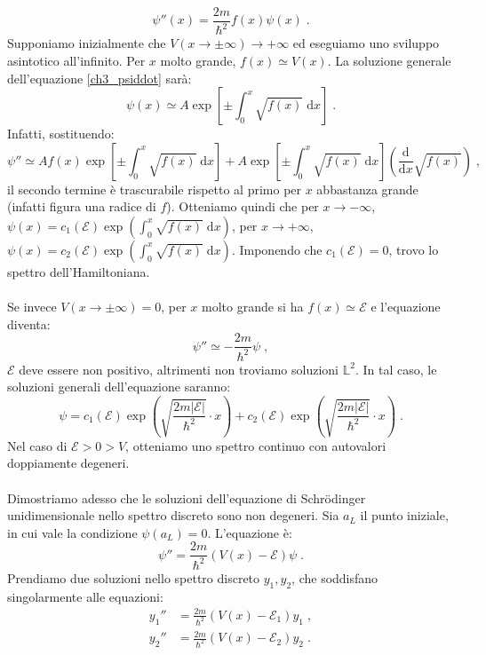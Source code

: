 \documentclass[10pt,a4paper]{report}
\theoremstyle{definition}
\numberwithin{equation}{section}
\newcommand{\diff}[1][]{\mathrm{d}#1}
\begin{document}
\begin{equation}
\psi''(x)=\frac{2m}{\hbar^2}f(x)\psi(x)\;. \label{ch3_psiddot}
\end{equation}
Supponiamo inizialmente che $V(x\to\pm\infty)\to +\infty$ ed eseguiamo uno sviluppo asintotico all'infinito. Per $x$ molto grande, $f(x)\simeq V(x)$. La soluzione generale dell'equazione \eqref{ch3_psiddot} sarà:
\begin{equation}
\psi(x)\simeq A\exp\left[\pm\int_{0}^{x}\sqrt{f(x)}\;\diff{x}\right]\;.
\end{equation}
Infatti, sostituendo:
$$
\psi''\simeq Af(x)\exp\left[\pm\int_{0}^{x} \sqrt{f(x)}\;\diff{x}\right]+ A\exp\left[\pm\int_{0}^{x} \sqrt{f(x)}\;\diff{x}\right]\left(\frac{\mathrm{d}}{\diff{x}}\sqrt{f(x)}\right)\;,
$$
il secondo termine è trascurabile rispetto al primo per $x$ abbastanza grande (infatti figura una radice di $f$). Otteniamo quindi che per $x\to -\infty$, $\psi(x)=c_1(\mathcal{E})\exp\left(\int_0^x \sqrt{f(x)}\;\diff{x}\right)$, per $x\to +\infty$, $\psi(x)=c_2(\mathcal{E})\exp\left(\int_0^x \sqrt{f(x)}\;\diff{x}\right)$. Imponendo che $c_1(\mathcal{E})=0$, trovo lo spettro dell'Hamiltoniana. \\
\\
Se invece $V(x\to\pm\infty)=0$, per $x$ molto grande si ha $f(x)\simeq \mathcal{E}$ e l'equazione diventa:
$$
\psi''\simeq -\frac{2m}{\hbar^2}\psi\;,
$$
$\mathcal{E}$ deve essere non positivo, altrimenti non troviamo soluzioni $\mathbb{L}^2$. In tal caso, le soluzioni generali dell'equazione saranno:
\begin{equation}
\psi=c_1(\mathcal{E})\exp\left(\sqrt{\frac{2m|\mathcal{E}|}{\hbar^2}}\cdot x\right)+c_2(\mathcal{E})\exp\left(\sqrt{\frac{2m|\mathcal{E}|}{\hbar^2}}\cdot x\right)\;.
\end{equation}
Nel caso di $\mathcal{E}>0>V$, otteniamo uno spettro continuo con autovalori doppiamente degeneri. \\
\\
Dimostriamo adesso che le soluzioni dell'equazione di Schrödinger unidimensionale nello spettro discreto sono non degeneri. Sia $a_L$ il punto iniziale, in cui vale la condizione $\psi(a_L)=0$. L'equazione è:
$$
\psi''=\frac{2m}{\hbar^2}(V(x)-\mathcal{E})\psi\;.
$$
Prendiamo due soluzioni nello spettro discreto $y_1,y_2$, che soddisfano singolarmente alle equazioni:
\begin{align*}
y_1'' &= \frac{2m}{\hbar^2}(V(x)-\mathcal{E}_1)y_1\;, \\
y_2'' &= \frac{2m}{\hbar^2}(V(x)-\mathcal{E}_2)y_2\;.
\end{align*}
\end{document}
